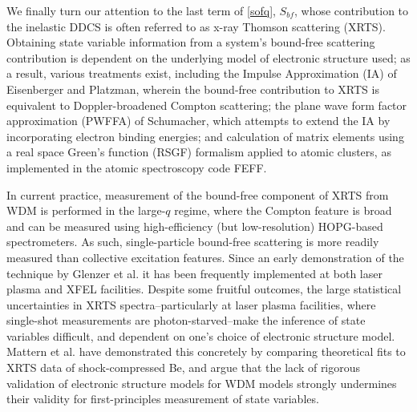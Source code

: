 \documentclass [11pt, proquest, article] {uwthesis}[2016/11/22]
\begin{document}
We finally turn our attention to the last term of \ref{sofq}, $S_{bf}$, whose contribution to the inelastic DDCS is often referred to as x-ray Thomson scattering (XRTS). Obtaining state variable information from a system's bound-free scattering contribution is dependent on the underlying model of electronic structure used; as a result, various treatments exist, including the Impulse Approximation (IA) of Eisenberger and Platzman, wherein the bound-free contribution to XRTS is equivalent to Doppler-broadened Compton scattering; the plane wave form factor approximation (PWFFA) of Schumacher, which attempts to extend the IA by incorporating electron binding energies; and calculation of matrix elements using a real space Green's function (RSGF) formalism applied to atomic clusters, as implemented in the atomic spectroscopy code FEFF. \cite{eisenberger1970compton, mattern2012real}


In current practice, measurement of the  bound-free component of XRTS from WDM is performed in the large-$q$ regime, where the Compton feature is broad and can be measured using high-efficiency (but low-resolution) HOPG-based spectrometers. \cite{lee2009x} As such, single-particle bound-free scattering is more readily measured than collective excitation features. Since an early demonstration of the technique by Glenzer et al. it has been frequently implemented at both laser plasma and XFEL facilities.\cite{glenzer2003demonstration}
   Despite some fruitful outcomes, the large statistical uncertainties in XRTS spectra--particularly at laser plasma facilities, where single-shot measurements are photon-starved--make the inference of state variables difficult, and dependent on one's choice of electronic structure model. \cite{mattern2013condensed} Mattern et al. have demonstrated this concretely by comparing theoretical fits to XRTS data of shock-compressed Be, and argue that the lack of rigorous validation of electronic structure models for WDM models strongly undermines their validity for first-principles measurement of state variables. 
\end{document}
